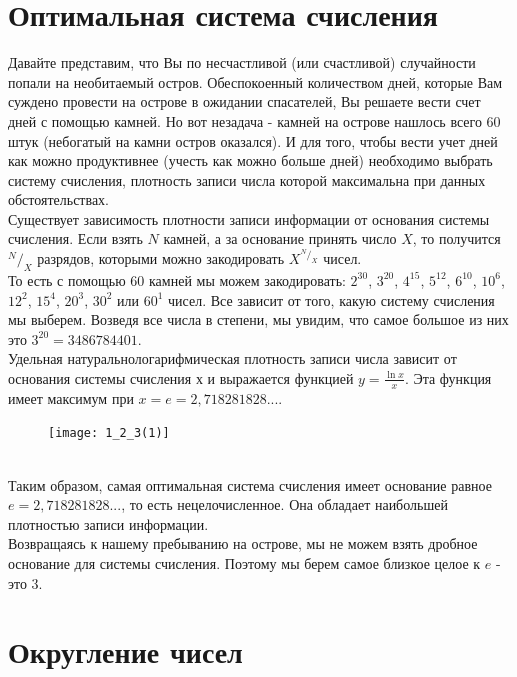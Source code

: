 \section{Оптимальная система счисления}
Давайте представим, что Вы по несчастливой (или счастливой) случайности попали на необитаемый остров. Обеспокоенный количеством дней, которые Вам суждено провести на острове в ожидании спасателей, Вы решаете вести счет дней с помощью камней. Но вот незадача - камней на острове нашлось всего 60 штук (небогатый на камни остров оказался). И для того, чтобы вести учет дней как можно продуктивнее (учесть как можно больше дней) необходимо выбрать систему счисления, плотность записи числа которой максимальна при данных обстоятельствах.
\\Существует зависимость плотности записи информации от основания системы счисления. Если взять $N$ камней, а за основание принять число $X$, то получится $^N/_X$ разрядов, которыми можно закодировать $X^{^N/_X}$ чисел.
\\То есть с помощью 60 камней мы можем закодировать: $2^{30}$, $3^{20}$, $4^{15}$, $5^{12}$, $6^{10}$, $10^{6}$, $12^{2}$, $15^{4}$, $20^{3}$, $30^{2}$ или $60^1$ чисел. Все зависит от того, какую систему счисления мы выберем. Возведя все числа в степени, мы увидим, что самое большое из них это $3^{20} = 3486784401$.
\\Удельная натуральнологарифмическая плотность записи числа зависит от основания системы счисления $х$ и выражается функцией $y = \frac{\ln{x}}{x}$. Эта функция имеет максимум при $x = e = 2,718281828...$.
\begin{figure}[h]
\centering
\texttt{[image: 1\_2\_3(1)]}
\end{figure}
\\Таким образом, самая оптимальная система счисления имеет основание равное $e = 2,718281828...$, то есть нецелочисленное. Она обладает наибольшей плотностью записи информации.
\\Возвращаясь к нашему пребыванию на острове, мы не можем взять дробное основание для системы счисления. Поэтому мы берем самое близкое целое к $e$ - это $3$.

\section{Округление чисел}

